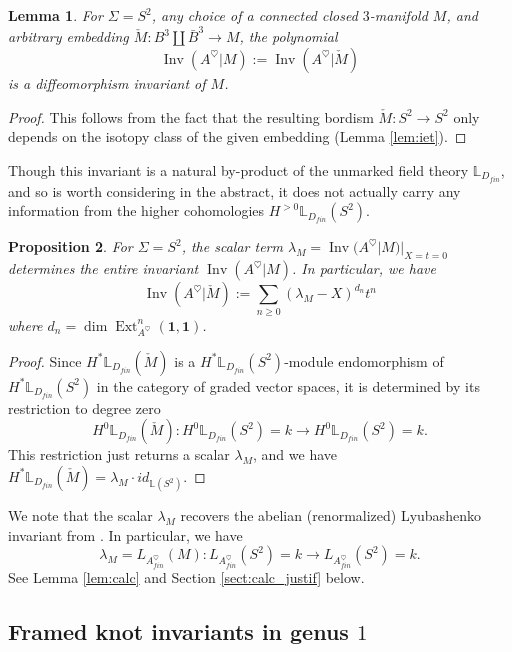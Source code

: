 \documentclass[reqno]{amsart}
\newtheorem{lemma}{Lemma}[section]
\newtheorem{proposition}[lemma]{Proposition}
\theoremstyle{definition}
\newcommand{\mbb}[1]{\mathbb{#1}}
\newcommand{\opn}[1]{\operatorname{#1}}
\DeclareMathOperator{\Ext}{Ext}
\renewcommand{\1}{\mathbf{1}}
\begin{document}
\begin{lemma}\label{lem:3d_0}
For $\Sigma=S^2$, any choice of a connected closed $3$-manifold $M$, and arbitrary embedding $\check{M}:B^3\amalg\bar{B}^3\to M$, the polynomial
\[
\opn{Inv}(A^{\heartsuit}|M):=\opn{Inv}(A^{\heartsuit}|\check{M})
\]
is a diffeomorphism invariant of $M$.
\end{lemma}

\begin{proof}
This follows from the fact that the resulting bordism $\check{M}:S^2\to S^2$ only depends on the isotopy class of the given embedding (Lemma \ref{lem:iet}).
\end{proof}

Though this invariant is a natural by-product of the unmarked field theory $\mbb{L}_{D_{fin}}$, and so is worth considering in the abstract, it does not actually carry any information from the higher cohomologies $H^{>0}\mbb{L}_{D_{fin}}(S^2)$.

\begin{proposition}\label{prop:inv_zero}
For $\Sigma=S^2$, the scalar term $\lambda_M=\opn{Inv}(A^{\heartsuit}|M)|_{X=t=0}$ determines the entire invariant $\opn{Inv}(A^{\heartsuit}|M)$.  In particular, we have
\[
\opn{Inv}(A^{\heartsuit}|\check{M}):=\sum_{n\geq 0}(\lambda_M-X)^{d_n} t^n
\]
where $d_n=\opn{dim}\Ext^n_{A^{\heartsuit}}(\1,\1)$.
\end{proposition}

\begin{proof}
Since $H^{\ast}\mbb{L}_{D_{fin}}(\check{M})$ is a $H^{\ast}\mbb{L}_{D_{fin}}(S^2)$-module endomorphism of $H^{\ast}\mbb{L}_{D_{fin}}(S^2)$ in the category of graded vector spaces, it is determined by its restriction to degree zero
\[
H^0\mbb{L}_{D_{fin}}(\check{M}):H^0\mbb{L}_{D_{fin}}(S^2)=k\to H^0\mbb{L}_{D_{fin}}(S^2)=k.
\]
This restriction just returns a scalar $\lambda_M$, and we have $H^{\ast}\mbb{L}_{D_{fin}}(\check{M})=\lambda_M\cdot id_{\mbb{L}(S^2)}$.
\end{proof}

We note that the scalar $\lambda_M$ recovers the abelian (renormalized) Lyubashenko invariant from \cite{derenzietal23}.  In particular, we have
\[
\lambda_M=L_{A^{\heartsuit}_{fin}}(M):L_{A^{\heartsuit}_{fin}}(S^2)=k\to L_{A^{\heartsuit}_{fin}}(S^2)=k.
\]
See Lemma \ref{lem:calc} and Section \ref{sect:calc_justif} below.

\subsection{Framed knot invariants in genus $1$}
\label{sect:3d_1}
\end{document}
